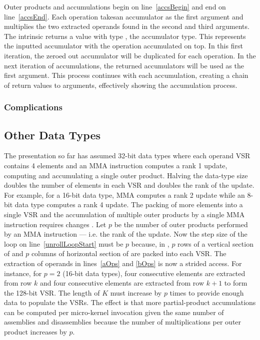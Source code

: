 \documentclass[\main/thesis.tex]{subfiles}
\begin{document}
Outer products and accumulations begin on line~\ref{accsBegin} and end on line~\ref{accsEnd}.
Each operation takesan accumulator as the first argument and multiplies the two extracted operands found in the second and third arguments.
The  intrinsic returns a value with type , the accumulator type.
This represents the inputted accumulator with the operation accumulated on top.
In this first iteration, the zeroed out accumulator will be duplicated for each operation.
In the next iteration of accumulations, the returned accumulators will be used as the first argument.
This process continues with each accumulation, creating a chain of return values to arguments, effectively showing the accumulation process.

\subsubsection{Complications}
\label{sec:complications}

\subsection{Other Data Types}
\label{sec:dataTypes}
The presentation so far has assumed 32-bit data types where each operand VSR contains 4 elements and an MMA instruction computes a rank 1 update, computing and accumulating a single outer product.
Halving the data-type size doubles the number of elements in each VSR and doubles the rank of the update.
For example, for a 16-bit data type, MMA computes a rank 2 update while an 8-bit data type computes a rank 4 update.
The packing of more elements into a single VSR and the accumulation of multiple outer products by a single MMA instruction requires changes .
Let $p$ be the number of outer products performed by an MMA instruction --- i.e. the rank of the update.
Now the step size of the loop on line~\ref{unrollLoopStart} must be $p$ because, in , $p$ rows of a vertical section of  and $p$ columns of horizontal section of  are packed into each VSR.
The extraction of operands in lines~\ref{aOps} and \ref{bOps} is now a strided access.
For instance, for $p=2$ (16-bit data types), four consecutive elements are extracted from row $k$ and four consecutive elements are extracted from row $k+1$ to form the 128-bit VSR.
The length of $K$ must increase by $p$ times to provide enough data to populate the VSRs.
The effect is that more partial-product accumulations can be computed per micro-kernel invocation given the same number of assemblies and disassemblies because the number of multiplications per outer product increases by $p$.
\end{document}

